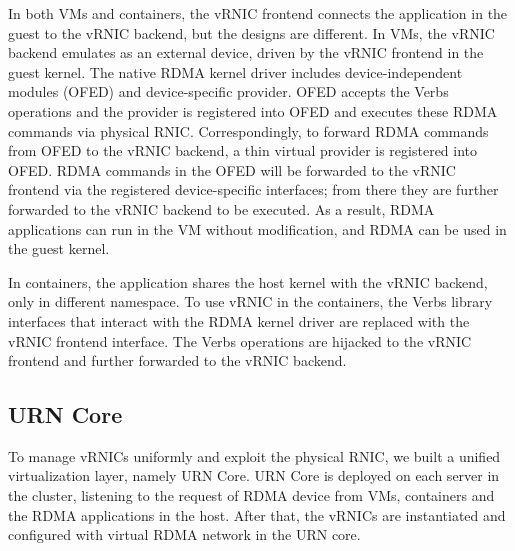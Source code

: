 In both VMs and containers, the vRNIC frontend connects the application in the guest to the vRNIC backend, but the designs are different. In VMs, the vRNIC backend emulates as an external device, driven by the vRNIC frontend in the guest kernel. The native RDMA kernel driver includes device-independent modules (OFED) and device-specific provider. OFED accepts the Verbs operations and the provider is registered into OFED and executes these RDMA commands via physical RNIC. Correspondingly, to forward RDMA commands from OFED to the vRNIC backend, a thin virtual provider is registered into OFED. RDMA commands in the OFED will be forwarded to the vRNIC frontend via the registered device-specific interfaces; from there
they are further forwarded to the vRNIC backend to be executed. As a result, RDMA applications can run in the VM without modification, and RDMA can be used in the guest kernel. 

In containers, the application shares the host kernel with the vRNIC backend, only in different namespace. To use vRNIC in the containers, the Verbs library interfaces that interact with the RDMA kernel driver are replaced with the vRNIC frontend interface. The Verbs operations are hijacked to the vRNIC frontend and further forwarded to the vRNIC backend.

\subsection{URN Core}

To manage vRNICs uniformly and exploit the physical RNIC, we built a unified virtualization layer, namely URN Core. URN Core is deployed on each server in the cluster, listening to the request of RDMA device from VMs, containers and the RDMA applications in the host. After that, the vRNICs are instantiated and configured with virtual RDMA network in the URN core.

